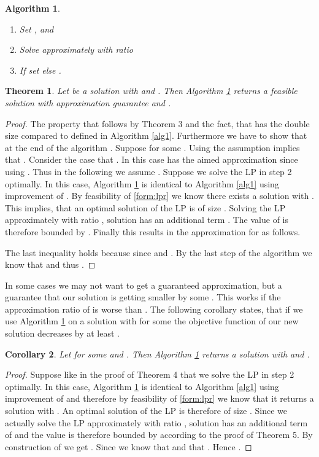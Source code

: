 \documentclass[a4paper,11pt]{article}
\newtheorem{thm}{Theorem}
\newtheorem{cor}[thm]{Corollary}
\newtheorem{algo}{Algorithm}
\begin{document}
\begin{algo}\label{alg2}
\ 
\begin{enumerate}
\item Set , 
  and 
\item Solve 
  approximately with ratio 
\item If  set 
else .
\end{enumerate}
\end{algo}
\begin{thm} \label{thm2}
	Let  be a solution with  and .
  Then Algorithm \ref{alg2} returns a feasible solution  with approximation guarantee  
  and .
\end{thm}
\begin{proof}
	The property that  follows by Theorem 3 and the fact,
	that  has the double size  compared to  defined in Algorithm \ref{alg1}. 
	Furthermore we have to show that at the end of the algorithm .
	Suppose  for some . Using the assumption 
	 implies that
	.
	Consider the case that . In this case  has the aimed approximation since 
	 using
	.
	Thus in the following we assume .
	Suppose we solve the LP in step 2 optimally. In this case, Algorithm \ref{alg2} is identical to Algorithm \ref{alg1} using improvement
	of . By feasibility of \ref{form:lpr} we know there exists a solution 
	with 
	.
	This implies, that an optimal solution  of the LP 
	 is of size . Solving the LP approximately with ratio , 
	solution  has an additional term . The value of 
	 is therefore bounded by
	.
	Finally this results in the approximation for  as follows.

The last inequality holds because  since  and .
	By the last step of the algorithm we know that  and thus
	.
\end{proof}
In some cases we may not want to get a guaranteed approximation, but a guarantee that our solution  is getting
smaller by some . This works if the approximation ratio of  is worse than . 
The following corollary states, that if we use Algorithm \ref{alg2} on a solution  with 
 for some  the objective function of our new solution 
 decreases by at least .
\begin{cor}\label{cor5}
	Let  for some  and 
	. Then Algorithm \ref{alg2} returns a solution
	 with  and 
	.
\end{cor}
\begin{proof}
	Suppose like in the proof of Theorem 4 that we solve the LP in step 2 optimally. In this case, Algorithm \ref{alg2} is 
	identical to Algorithm \ref{alg1} using improvement
	of  and therefore by feasibility of \ref{form:lpr} we know that it returns a solution 
	with 
	.
	An optimal solution  of the LP
	 is therefore of size . Since we actually solve the LP approximately with ratio , 
	solution  has an additional term of  and the value is therefore 
	bounded by
	 according to the proof of Theorem 5.
	By construction of  we get . Since  we know that
        and that . Hence .
\end{proof}
\end{document}
